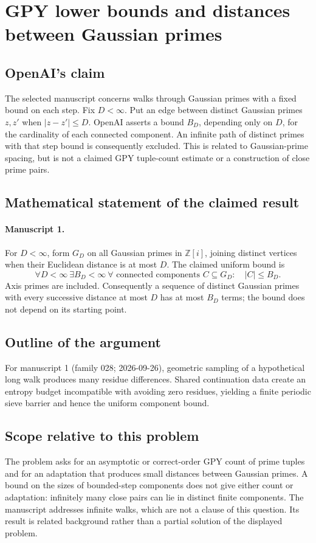 \documentclass[11pt]{article}
\begin{document}
\section*{GPY lower bounds and distances between Gaussian primes}

\subsection{OpenAI's claim}
The selected manuscript concerns walks through Gaussian primes with a fixed bound on each step. Fix $D<\infty$. Put an edge between distinct Gaussian primes $z,z'$ when $|z-z'|\le D$. OpenAI asserts a bound $B_D$, depending only on $D$, for the cardinality of each connected component. An infinite path of distinct primes with that step bound is consequently excluded. This is related to Gaussian-prime spacing, but is not a claimed GPY tuple-count estimate or a construction of close prime pairs.

\subsection{Mathematical statement of the claimed result}
\paragraph{Manuscript 1.}
For $D<\infty$, form $G_D$ on all Gaussian primes in $\mathbb Z[i]$, joining distinct vertices when their Euclidean distance is at most $D$. The claimed uniform bound is
\[
 \forall D<\infty\ \exists B_D<\infty\ \forall\text{ connected components }C\subseteq G_D:\quad |C|\le B_D.
\]
Axis primes are included. Consequently a sequence of distinct Gaussian primes with every successive distance at most $D$ has at most $B_D$ terms; the bound does not depend on its starting point.

\subsection{Outline of the argument}
For manuscript 1 (family 028; 2026-09-26), geometric sampling of a hypothetical long walk produces many residue differences. Shared continuation data create an entropy budget incompatible with avoiding zero residues, yielding a finite periodic sieve barrier and hence the uniform component bound.

\subsection{Scope relative to this problem}
The problem asks for an asymptotic or correct-order GPY count of prime tuples and for an adaptation that produces small distances between Gaussian primes. A bound on the sizes of bounded-step components does not give either count or adaptation: infinitely many close pairs can lie in distinct finite components. The manuscript addresses infinite walks, which are not a clause of this question. Its result is related background rather than a partial solution of the displayed problem.
\end{document}
